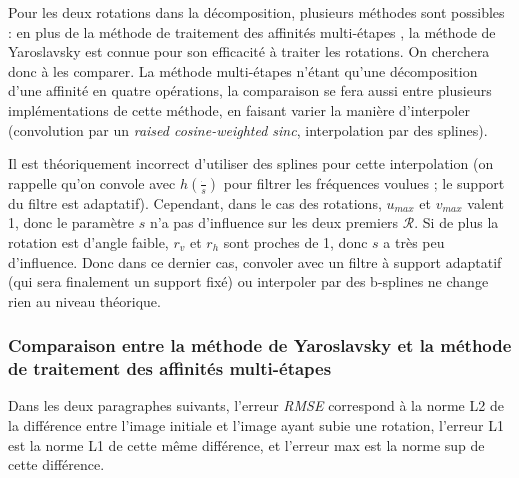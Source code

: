 
Pour les deux rotations dans la décomposition, plusieurs méthodes sont possibles : en plus de la méthode de traitement des affinités multi-étapes \cite{szeliski2010high}, la méthode de Yaroslavsky \cite{unser1995convolution} est connue pour son efficacité à traiter les rotations. On cherchera donc à les comparer. La méthode multi-étapes n'étant qu'une décomposition d'une affinité en quatre opérations, la comparaison se fera aussi entre plusieurs implémentations de cette méthode, en faisant varier la manière d'interpoler (convolution par un \emph{raised cosine-weighted sinc}, interpolation par des splines).

Il est théoriquement incorrect d'utiliser des splines pour cette interpolation (on rappelle qu'on convole avec $h(\frac{\dot{}}{s})$ pour filtrer les fréquences voulues ; le support du filtre est adaptatif). Cependant, dans le cas des rotations, $u_{max}$ et $v_{max}$ valent 1, donc le paramètre $s$ n'a pas d'influence sur les deux premiers $\mathcal R$. Si de plus la rotation est d'angle faible, $r_v$ et $r_h$ sont proches de 1, donc $s$ a très peu d'influence. Donc dans ce dernier cas, convoler avec un filtre à support adaptatif (qui sera finalement un support fixé) ou interpoler par des b-splines ne change rien au niveau théorique.


\subsubsection*{Comparaison entre la méthode de Yaroslavsky et la méthode de traitement des affinités multi-étapes}

	Dans les deux paragraphes suivants, l'erreur \emph{RMSE} correspond à la norme L2 de la différence entre l'image initiale et l'image ayant subie une rotation, l'erreur L1 est la norme L1 de cette même différence, et l'erreur max est la norme sup de cette différence.\\

